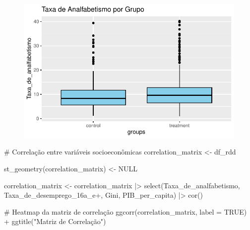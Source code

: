 \documentclass[
  letterpaper,
  DIV=11,
  numbers=noendperiod]{scrartcl}
\newenvironment{Shaded}{\begin{snugshade}}{\end{snugshade}}
\newcommand{\AttributeTok}[1]{\textcolor[rgb]{0.40,0.45,0.13}{#1}}
\newcommand{\CommentTok}[1]{\textcolor[rgb]{0.37,0.37,0.37}{#1}}
\newcommand{\ConstantTok}[1]{\textcolor[rgb]{0.56,0.35,0.01}{#1}}
\newcommand{\FunctionTok}[1]{\textcolor[rgb]{0.28,0.35,0.67}{#1}}
\newcommand{\NormalTok}[1]{\textcolor[rgb]{0.00,0.23,0.31}{#1}}
\newcommand{\OtherTok}[1]{\textcolor[rgb]{0.00,0.23,0.31}{#1}}
\newcommand{\SpecialCharTok}[1]{\textcolor[rgb]{0.37,0.37,0.37}{#1}}
\newcommand{\StringTok}[1]{\textcolor[rgb]{0.13,0.47,0.30}{#1}}
\begin{document}
\begin{figure}[H]

{\centering \includegraphics{maps_files/figure-pdf/unnamed-chunk-17-1.pdf}

}

\end{figure}

\begin{Shaded}
\begin{Highlighting}[]
\CommentTok{\# Correlação entre variáveis socioeconômicas}
\NormalTok{correlation\_matrix }\OtherTok{\textless{}{-}}\NormalTok{ df\_rdd}

\FunctionTok{st\_geometry}\NormalTok{(correlation\_matrix) }\OtherTok{\textless{}{-}} \ConstantTok{NULL}

\NormalTok{correlation\_matrix }\OtherTok{\textless{}{-}}\NormalTok{ correlation\_matrix }\SpecialCharTok{|\textgreater{}} 
  \FunctionTok{select}\NormalTok{(Taxa\_de\_analfabetismo, }\StringTok{\textasciigrave{}}\AttributeTok{Taxa\_de\_desemprego\_16a\_e+}\StringTok{\textasciigrave{}}\NormalTok{, Gini, PIB\_per\_capita) }\SpecialCharTok{|\textgreater{}}  
  \FunctionTok{cor}\NormalTok{()}

\CommentTok{\# Heatmap da matriz de correlação}
\FunctionTok{ggcorr}\NormalTok{(correlation\_matrix, }\AttributeTok{label =} \ConstantTok{TRUE}\NormalTok{) }\SpecialCharTok{+}
  \FunctionTok{ggtitle}\NormalTok{(}\StringTok{"Matriz de Correlação"}\NormalTok{)}
\end{Highlighting}
\end{Shaded}
\end{document}
